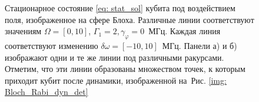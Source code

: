 \begin{figure}[h]
	{ \raggedleft
		\hfill
		\def\svgwidth{2.5in}
		\fontsize{19pt}{19pt}\selectfont
		\hfill
		\def\svgwidth{2.5in}
		
		\hfill
	}
	\caption[Стационарное состояние кубита, вращаемого электромагнитным полем.]{Стационарное состояние \eqref{eq: stat_sol} кубита под воздействием поля, изображенное на сфере Блоха. Различные линии соответствуют значениям $\Omega=[0,10]$, $\Gamma_1=2, \gamma_\varphi=0 $~МГц. Каждая линия соответствуют изменению $\delta\omega=[-10,10]$~МГц. Панели а) и б) изображают одни и те же линии под различными ракурсами. Отметим, что эти линии образованы множеством точек, к которым приходит кубит после динамики, изображенной на~Рис. \ref{img: Bloch_Rabi_dyn_det} \label{img: bloch_stat}}
	
\end{figure}
